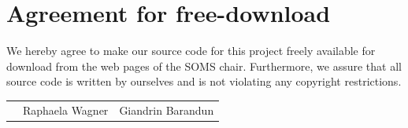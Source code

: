 \documentclass[11pt]{article}
\begin{document}

\newpage


\newpage
\thispagestyle{empty}
\section*{Agreement for free-download}
\bigskip


\bigskip


\large We hereby agree to make our source code for this project freely available for download from the web pages of the SOMS chair. Furthermore, we assure that all source code is written by ourselves and is not violating any copyright restrictions.

\begin{center}

\bigskip


\bigskip


\begin{tabular}{@{}p{3.3cm}@{}p{6cm}@{}@{}p{6cm}@{}}
\begin{minipage}{3cm}

\end{minipage}
&
\begin{minipage}{6cm}
\vspace{2mm} \large Raphaela Wagner


\end{minipage}
&
\begin{minipage}{6cm}

\large Giandrin Barandun

\end{minipage}
\end{tabular}


\end{center}
\newpage







\newpage

\thispagestyle{empty}
\tableofcontents
\end{document}
